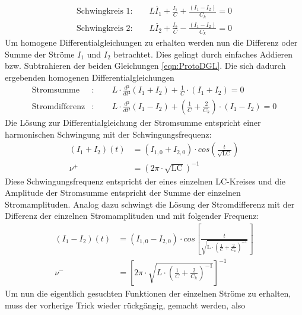 \documentclass[titlepage = firstcover]{scrartcl}
\begin{document}
        \begin{align}
            \text{Schwingkreis 1:} \qquad L\ddot{I_1} + \frac{I_1}{C} + \frac{\left(I_1 - I_2\right)}{C_k} = 0 \\
            \text{Schwingkreis 2:} \qquad L\ddot{I_2} + \frac{I_2}{C} - \frac{\left(I_1 - I_2\right)}{C_k} = 0 
            \label{eqn:ProtoDGL}
        \end{align}
        Um homogene Differentialgleichungen zu erhalten werden nun die Differenz oder Summe der Ströme $I_1$ und $I_2$ betrachtet. Dies gelingt durch 
        einfaches Addieren bzw. Subtrahieren der beiden Gleichungen \ref{eqn:ProtoDGL}. 
        Die sich dadurch ergebenden homogenen Differentialgleichungen
        \begin{align}
            \text{Stromsumme} &: \qquad L \cdot \frac{d²}{dt²}\left(I_1+I_2\right) + \frac{1}{C} \cdot \left(I_1 + I_2\right) = 0 \\
            \text{Stromdifferenz} &: \qquad L \cdot \frac{d²}{dt²}\left(I_1-I_2\right) + \left(\frac{1}{C}+\frac{2}{C_k}\right) \cdot \left(I_1 - I_2\right) = 0
        \end{align}
        Die Lösung zur Differentialgleichung der Stromsumme entspricht einer harmonischen Schwingung mit der Schwingungsfrequenz:
        \begin{align}
            \left(I_1 + I_2\right)(t) &= \left(I_{1,0} + I_{2,0}\right) \cdot cos(\frac{t}{\sqrt{\text{LC}}}) \\
            \nu^+ &= (2\pi \cdot \sqrt{\text{LC}})^{-1} 
            \label{eqn:nu+}
        \end{align}
        Diese Schwingungsfrequenz entspricht der eines einzelnen LC-Kreises und die Amplitude der Stromsumme entspricht der Summe der einzelnen 
        Stromamplituden. \newline
        Analog dazu schwingt die Lösung der Stromdifferenz mit der Differenz der einzelnen Stromamplituden und mit folgender Frequenz:
        \begin{align}
            \left(I_1 - I_2\right)(t) &= \left(I_{1,0} - I_{2,0}\right) \cdot cos\left[\frac{t}{\sqrt{\text{L} \cdot \left(\frac{1}{C}+\frac{2}{C_k}\right)^{-1}}}\right] \\
            \nu^- &= \left[2\pi \cdot \sqrt{L \cdot \left(\frac{1}{C}+\frac{2}{C_k}\right)^{-1}}\right]^{-1} 
            \label{eqn:nu-}
        \end{align}
        Um nun die eigentlich gesuchten Funktionen der einzelnen Ströme zu erhalten, muss der vorherige Trick wieder rückgängig, gemacht werden, also 
\end{document}
